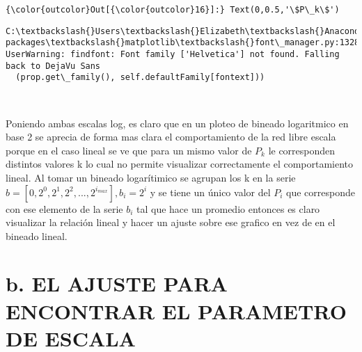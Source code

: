 \documentclass[11pt]{article}
\begin{document}
\begin{Verbatim}[commandchars=\\\{\}]
{\color{outcolor}Out[{\color{outcolor}16}]:} Text(0,0.5,'\$P\_k\$')
\end{Verbatim}
            
    \begin{Verbatim}[commandchars=\\\{\}]
C:\textbackslash{}Users\textbackslash{}Elizabeth\textbackslash{}Anaconda3\textbackslash{}lib\textbackslash{}site-packages\textbackslash{}matplotlib\textbackslash{}font\_manager.py:1328: UserWarning: findfont: Font family ['Helvetica'] not found. Falling back to DejaVu Sans
  (prop.get\_family(), self.defaultFamily[fontext]))

    \end{Verbatim}

    \begin{center}
    \end{center}
    { \hspace*{\fill} \\}
    
    Poniendo ambas escalas log, es claro que en un ploteo de bineado
logaritmico en base 2 se aprecia de forma mas clara el comportamiento de
la red libre escala porque en el caso lineal se ve que para un mismo
valor de \(P_k\) le corresponden distintos valores k lo cual no permite
visualizar correctamente el comportamiento lineal. Al tomar un bineado
logarítimico se agrupan los k en la serie
\(b = [0, 2^0, 2^1, 2^2, ... ,2^{i_{max}}], b_i = 2^i\) y se tiene un
único valor del \(P_i\) que corresponde con ese elemento de la serie
\(b_i\) tal que hace un promedio entonces es claro visualizar la
relación lineal y hacer un ajuste sobre ese grafico en vez de en el
bineado lineal.

    \section{b. EL AJUSTE PARA ENCONTRAR EL PARAMETRO DE
ESCALA}\label{b.-el-ajuste-para-encontrar-el-parametro-de-escala}
\end{document}

